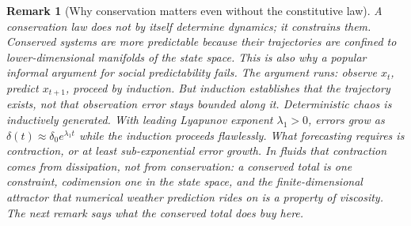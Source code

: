 \documentclass[11pt]{article}
\newtheorem{remark}{Remark}
\begin{document}
\begin{remark}[Why conservation matters even without the constitutive law]
A conservation law does not by itself determine dynamics; it constrains them. Conserved systems are more predictable because their trajectories are confined to lower-dimensional manifolds of the state space. This is also why a popular informal argument for social predictability fails. The argument runs: observe $x_t$, predict $x_{t+1}$, proceed by induction. But induction establishes that the trajectory \emph{exists}, not that observation error stays bounded along it. Deterministic chaos is inductively generated. With leading Lyapunov exponent $\lambda_1 > 0$, errors grow as $\delta(t) \approx \delta_0 e^{\lambda_1 t}$ \cite{lorenz1963} while the induction proceeds flawlessly. What forecasting requires is contraction, or at least sub-exponential error growth. In fluids that contraction comes from dissipation, not from conservation: a conserved total is one constraint, codimension one in the state space, and the finite-dimensional attractor that numerical weather prediction rides on is a property of viscosity. The next remark says what the conserved total does buy here.
\end{remark}
\end{document}

